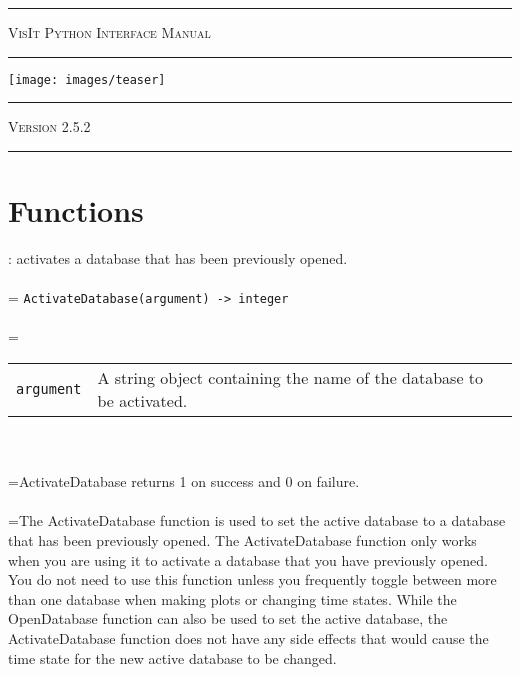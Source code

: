 \documentclass[10pt,a4paper]{report}
\begin{document}
\begin{titlepage}
\begin{center}
\hrule
\textsc{\huge VisIt Python Interface Manual}\\[0.5cm]
\hrule
\texttt{[image: images/teaser]}\\[0.5cm]
\hrule
\textsc{\LARGE Version 2.5.2}\\[0.5cm]
\hrule

\date{}
\end{center}
\end{titlepage}

\tableofcontents
\newpage
{}





\chapter{Functions}


{}
: activates a database that has been previously opened.\\[-3mm]

 \\ 
\hangindent=\parindent 
\verb!ActivateDatabase(argument) -> integer!\\ [-3mm]

 \\ 
\hangindent=\parindent 
\begin{tabular}{lp{9cm}}
\verb!argument! & A string object containing the name of the database to be activated. \\
\end{tabular} \\[-2mm]


 \\ 
\hangindent=\parindent ActivateDatabase returns 1 on success and 0 on failure. \\[-3mm] 

 \\ 
\hangindent=\parindent The ActivateDatabase function is used to set the active database to a database that has been previously opened. The ActivateDatabase function only works when you are using it to activate a database that you have previously opened. You do not need to use this function unless you frequently toggle between more than one database when making plots or changing time states. While the OpenDatabase function can also be used to set the active database, the ActivateDatabase function does not have any side effects that would cause the time state for the new active database to be changed. \\[-3mm] 
\end{document}
